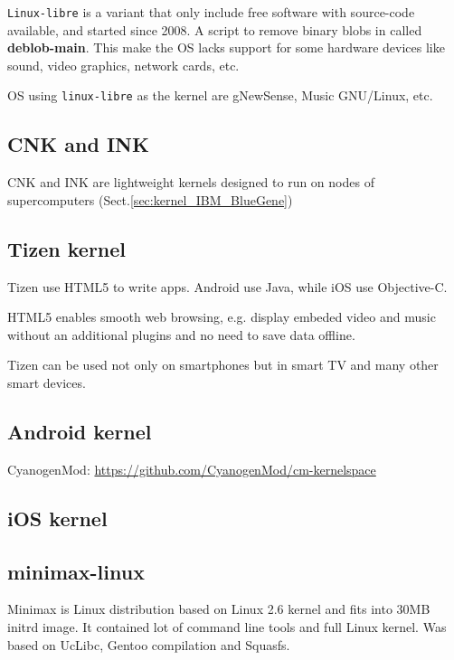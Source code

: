 \verb!Linux-libre! is a variant that only include free software with source-code
available, and started since 2008. A script to remove binary blobs in called
{\bf deblob-main}. This make the OS lacks support for some hardware devices
like sound, video graphics, network cards, etc.

OS using \verb!linux-libre! as the kernel are gNewSense, Music GNU/Linux, etc.

\subsection{CNK and INK}

CNK and INK are lightweight kernels designed to run on nodes of supercomputers
(Sect.\ref{sec:kernel_IBM_BlueGene})


\subsection{Tizen kernel}

Tizen use HTML5 to write apps. Android use Java, while iOS use Objective-C.

HTML5 enables smooth web browsing, e.g. display embeded video and music without
an additional plugins and no need to save data offline.

Tizen can be used not only on smartphones but in smart TV and many other smart
devices.

\subsection{Android kernel}

CyanogenMod: \url{https://github.com/CyanogenMod/cm-kernelspace}


\subsection{iOS kernel}


\subsection{minimax-linux}
\label{sec:minimax-linux}

Minimax is Linux distribution based on Linux 2.6 kernel and fits into 30MB
initrd image. It contained lot of command line tools and full Linux kernel. Was
based on UcLibc, Gentoo compilation and Squasfs.

